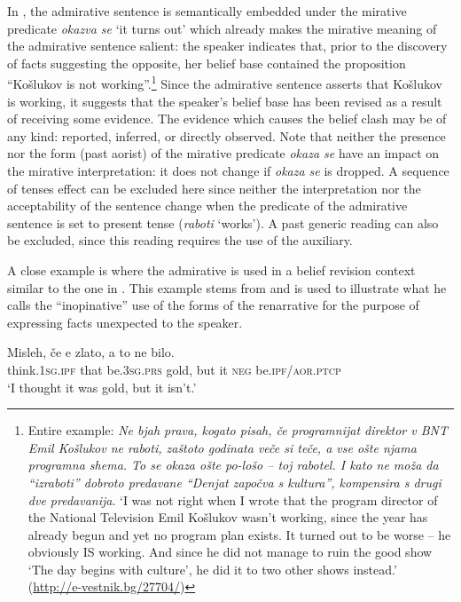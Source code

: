 \documentclass[output=paper,
colorlinks,
citecolor=brown,
newtxmath
]{langscibook}
\begin{document}
\noindent In , the admirative sentence is semantically embedded under the mirative predicate \textit{okazva se} `it turns out' which already makes the mirative meaning of the admirative sentence salient: the speaker indicates that, prior to the discovery of facts suggesting the opposite, her belief base contained the proposition ``Košlukov is not working''.\footnote{Entire example: \textit{Ne bjah prava, kogato pisah, če programnijat direktor v BNT Emil Košlukov ne raboti, zaštoto godinata veče si teče, a vse ošte njama programna shema. To se okaza ošte po-lošo -- toj rabotel. I kato ne moža da ``izraboti'' dobroto predavane ``Denjat započva s kultura'', kompensira s drugi dve predavanija}.
`I was not right when I wrote that the program director of the  National Television Emil Košlukov wasn't working, since the year has already begun and yet no program plan exists. It turned out to be worse -- he obviously IS working. And since he did not manage to ruin the good show `The day begins with culture', he did it to two other shows instead.' \hfill (\url{http://e-vestnik.bg/27704/})} Since the admirative sentence asserts that Košlukov is working, it suggests that the speaker's belief base has been revised as a result of receiving some evidence. The evidence which causes the belief clash may be of any kind: reported, inferred, or directly observed. Note that neither the presence nor the form (past aorist) of the mirative predicate \textit{okaza se} have an impact on the mirative interpretation: it does not change if \textit{okaza se} is dropped. A sequence of tenses effect can be excluded here since neither the interpretation nor the acceptability of the sentence change when the predicate of the admirative sentence is set to present tense (\textit{raboti} `works'). A past generic reading can also be excluded, since this reading requires the use of the auxiliary. %

A close example is  where the admirative is used in a belief revision context similar to the one in . This example stems from \citet[68]{Andrejcin1938} and is used to illustrate what he calls the ``inopinative'' use of the forms of the renarrative for the purpose of expressing facts unexpected to the speaker.

\ea \label{ex:misleh}
\gll Misleh, če e zlato, a to ne bilo.\\
think.\textsc{1sg.ipf} that be.\textsc{3sg.prs} gold, but it \textsc{neg} be.\textsc{ipf/aor.ptcp} \\
\glt `I thought it was gold, but it isn't.'
\z
\end{document}
